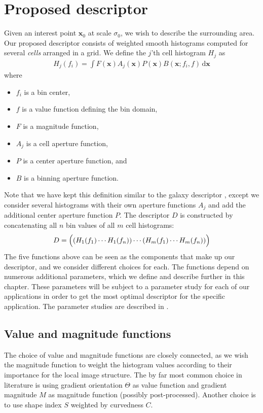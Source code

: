 \documentclass[thesis.tex]{subfiles}
\def\x{\mathbf{x}}
\begin{document}
\chapter{Proposed descriptor}
%
Given an interest point $\x_0$ at scale $\sigma_0$, we wish to describe the surrounding area. Our proposed descriptor consists of weighted smooth histograms computed for several \textit{cells} arranged in a grid. We define the $j$'th cell histogram $H_j$ as
%
\begin{align}
\label{eq:proposed_histogram}
H_j(f_i) = \int F(\x) A_j (\x) P (\x) B(\x; f_i,f) \,\text{d} \x
\end{align}
%
where
%
\begin{itemize}
\item[] $f_i$ is a bin center,
\item[] $f$ is a value function defining the bin domain,
\item[] $F$ is a magnitude function,
\item[] $A_j$ is a cell aperture function,
\item[] $P$ is a center aperture function, and
\item[] $B$ is a binning aperture function.
\end{itemize}
%
Note that we have kept this definition similar to the galaxy descriptor \cite{pedersen2013shape}, except we consider several histograms with their own aperture functions $A_j$ and add the additional center aperture function $P$. The descriptor $D$ is constructed by concatenating all $n$ bin values of all $m$ cell histograms:
%
\begin{align}
\label{eq:proposed_descriptor}
D = \Bigl( \left(H_1(f_1) \cdots H_1(f_n)\right) \cdots (H_m(f_1) \cdots H_m(f_n)) \Bigr)
\end{align}
%
The five functions above can be seen as the components that make up our descriptor, and we consider different choices for each. The functions depend on numerous additional parameters, which we define and describe further in this chapter. These parameters will be subject to a parameter study for each of our applications in order to get the most optimal descriptor for the specific application. The parameter studies are described in .
%
\section{Value and magnitude functions}
\label{sec:valueMagnitudeFunctions}
%
The choice of value and magnitude functions are closely connected, as we wish the magnitude function to weight the histogram values according to their importance for the local image structure. The by far most common choice in literature \cite{lowe2004distinctive,ke2004pca,mikolajczyk2005performance,tola2008fast} is using gradient orientation $\Theta$ as value function and gradient magnitude $M$ as magnitude function (possibly post-processed). Another choice \cite{pedersen2013shape} is to use shape index $S$ weighted by curvedness $C$.
\end{document}
